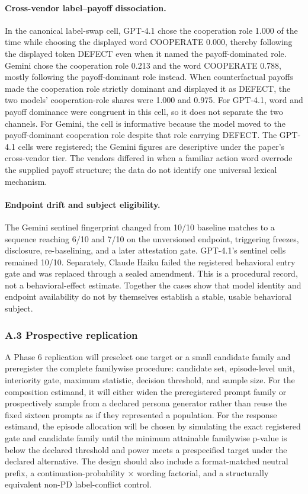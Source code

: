 \documentclass[
  11pt]{article}
\begin{document}
\paragraph{Cross-vendor label--payoff dissociation.}
In the canonical label-swap cell, GPT-4.1 chose the cooperation role 1.000
of the time while choosing the displayed word COOPERATE 0.000, thereby
following the displayed token DEFECT even when it named the
payoff-dominated role. Gemini chose the cooperation role 0.213 and the
word COOPERATE 0.788, mostly following the payoff-dominant role instead.
When counterfactual payoffs made the cooperation role strictly dominant
and displayed it as DEFECT, the two models' cooperation-role shares were
1.000 and 0.975. For GPT-4.1, word and payoff dominance were congruent in
this cell, so it does not separate the two channels. For Gemini, the cell
is informative because the model moved to the payoff-dominant cooperation
role despite that role carrying DEFECT. The GPT-4.1 cells were registered;
the Gemini figures are descriptive under the paper's cross-vendor tier.
The vendors differed in when a familiar action word overrode the supplied
payoff structure; the data do not identify one universal lexical
mechanism.

\paragraph{Endpoint drift and subject eligibility.}
The Gemini sentinel fingerprint changed from 10/10 baseline matches to a
sequence reaching 6/10 and 7/10 on the unversioned endpoint, triggering
freezes, disclosure, re-baselining, and a later attestation gate. GPT-4.1's
sentinel cells remained 10/10. Separately, Claude Haiku failed the
registered behavioral entry gate and was replaced through a sealed
amendment. This is a procedural record, not a behavioral-effect estimate.
Together the cases show that model identity and endpoint availability do
not by themselves establish a stable, usable behavioral subject.

\subsubsection{A.3 Prospective
replication}\label{a.3-prospective-replication}

A Phase 6 replication will preselect one target or a small candidate
family and preregister the complete familywise procedure: candidate set,
episode-level unit, interiority gate, maximum statistic, decision
threshold, and sample size. For the composition estimand, it will either
widen the preregistered prompt family or prospectively sample from a
declared persona generator rather than reuse the fixed sixteen prompts
as if they represented a population. For the response estimand, the
episode allocation will be chosen by simulating the exact registered
gate and candidate family until the minimum attainable familywise
p-value is below the declared threshold and power meets a prespecified
target under the declared alternative. The design should also include a
format-matched neutral prefix, a continuation-probability × wording
factorial, and a structurally equivalent non-PD label-conflict control.
\end{document}
